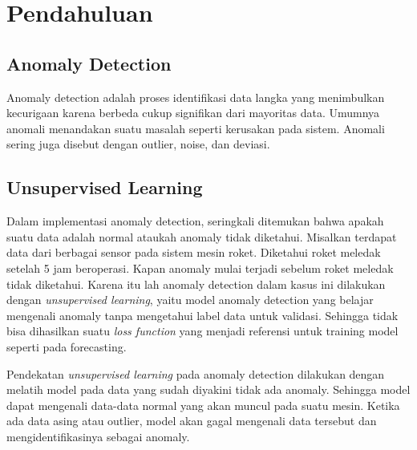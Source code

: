 \chapter{Pendahuluan}

\section{Anomaly Detection}

Anomaly detection adalah proses identifikasi data langka yang menimbulkan kecurigaan karena berbeda cukup signifikan dari mayoritas data. Umumnya anomali menandakan suatu masalah seperti kerusakan pada sistem. Anomali sering juga disebut dengan outlier, noise, dan deviasi.

\section{Unsupervised Learning}

Dalam implementasi anomaly detection, seringkali ditemukan bahwa apakah suatu data adalah normal ataukah anomaly tidak diketahui. Misalkan terdapat data dari berbagai sensor pada sistem mesin roket. Diketahui roket meledak setelah 5 jam beroperasi. Kapan anomaly mulai terjadi sebelum roket meledak tidak diketahui. Karena itu lah anomaly detection dalam kasus ini dilakukan dengan \emph{unsupervised learning}, yaitu model anomaly detection yang belajar mengenali anomaly tanpa mengetahui label data untuk validasi. Sehingga tidak bisa dihasilkan suatu \emph{loss function} yang menjadi referensi untuk training model seperti pada forecasting.

Pendekatan \emph{unsupervised learning} pada anomaly detection dilakukan dengan melatih model pada data yang sudah diyakini tidak ada anomaly. Sehingga model dapat mengenali data-data normal yang akan muncul pada suatu mesin. Ketika ada data asing atau outlier, model akan gagal mengenali data tersebut dan mengidentifikasinya sebagai anomaly. \cite{unsupervised_anomaly}
